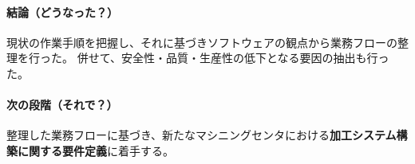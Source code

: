 {\paragraph*{結論（どうなった？）}
現状の作業手順を把握し、それに基づきソフトウェアの観点から業務フローの整理を行った。
併せて、安全性・品質・生産性の低下となる要因の抽出も行った。
\tcbline*
\paragraph*{次の段階（それで？）}
整理した業務フローに基づき、新たなマシニングセンタにおける\textbf{加工システム構築に関する要件定義}に着手する。
}





\begin{appendices}
\end{appendices}

